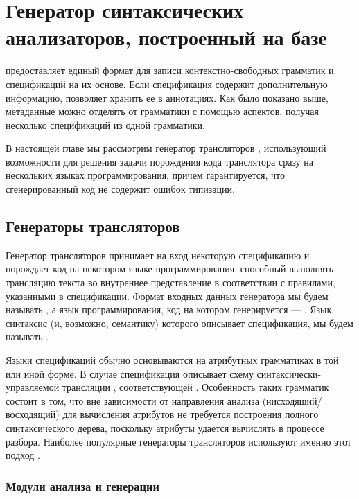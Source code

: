 \part{Генератор синтаксических анализаторов, построенный на базе \GRM{}}\label{part3}

\GRM{} предоставляет единый формат для записи контекстно-свободных грамматик и спецификаций на их основе. Если спецификация содержит дополнительную информацию, \GRM{} позволяет хранить ее в аннотациях. Как было показано выше, метаданные можно отделять от грамматики с помощью аспектов, получая несколько спецификаций из одной грамматики.

В настоящей главе мы рассмотрим генератор трансляторов \ATF{}, использующий возможности \GRM{} для решения задачи порождения кода транслятора сразу на нескольких языках программирования, причем гарантируется, что сгенерированный код не содержит ошибок типизации.

\chapter{Генераторы трансляторов}

Генератор трансляторов принимает на вход некоторую спецификацию и порождает код на некотором языке программирования, способный выполнять трансляцию текста во внутреннее представление в соответствии с правилами, указанными в спецификации.
Формат входных данных генератора мы будем называть , а язык программирования, код на котором генерируется --- . Язык, синтаксис (и, возможно, семантику) которого описывает спецификация, мы будем называть .

Языки спецификаций обычно основываются на атрибутных грамматиках \cite{???Knuth} в той или иной форме. В случае \ATF{} спецификация описывает схему синтаксически-управляемой трансляции \cite{???Dragon}, соответствующей  \cite{???}. Особенность таких грамматик состоит в том, что вне зависимости от направления анализа (нисходящий/восходящий) для вычисления атрибутов не требуется построения полного синтаксического дерева, поскольку атрибуты удается вычислять в процессе разбора. Наиболее популярные генераторы трансляторов используют именно этот подход \cite{???}.

\section{Модули анализа и генерации}\label{antlr_example}

